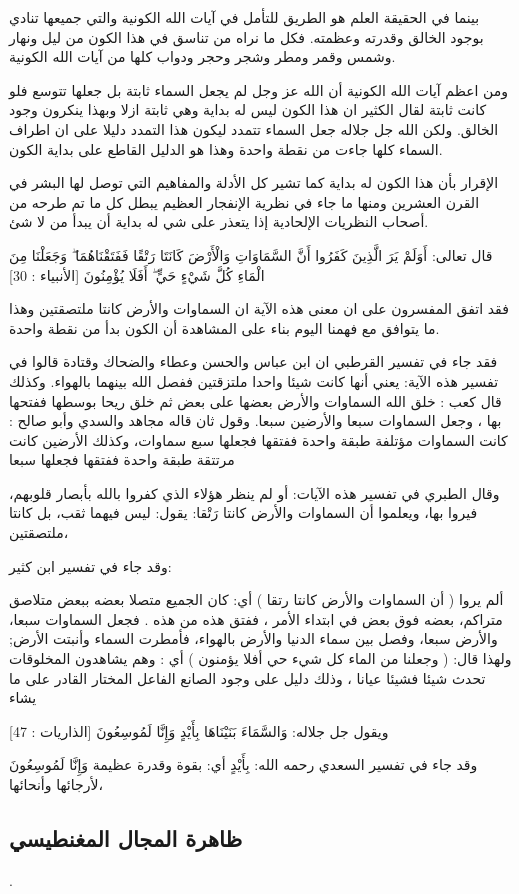 بينما في الحقيقة العلم هو الطريق للتأمل في آيات الله الكونية والتي جميعها تنادي بوجود الخالق وقدرته وعظمته. فكل ما نراه من تناسق في هذا الكون من ليل ونهار وشمس وقمر ومطر وشجر وحجر ودواب كلها من آيات الله الكونية.

ومن اعظم آيات الله الكونية أن الله عز وجل لم يجعل السماء ثابتة بل جعلها تتوسع فلو كانت ثابتة لقال الكثير ان هذا الكون ليس له بداية وهي ثابتة ازلا وبهذا ينكرون وجود الخالق. ولكن الله جل جلاله جعل السماء تتمدد ليكون هذا التمدد دليلا على ان اطراف السماء كلها جاءت من نقطة واحدة وهذا هو الدليل القاطع على بداية الكون.

الإقرار بأن هذا الكون له بداية كما تشير كل الأدلة والمفاهيم التي توصل لها البشر في القرن العشرين ومنها ما جاء في نظرية الإنفجار العظيم يبطل كل ما تم طرحه من أصحاب النظريات الإلحادية إذا يتعذر على شي له بداية أن يبدأ من لا شئ.

قال تعالى:
أَوَلَمْ يَرَ الَّذِينَ كَفَرُوا أَنَّ السَّمَاوَاتِ وَالْأَرْضَ كَانَتَا رَتْقًا فَفَتَقْنَاهُمَا ۖ وَجَعَلْنَا مِنَ الْمَاءِ كُلَّ شَيْءٍ حَيٍّ ۖ أَفَلَا يُؤْمِنُونَ [الأنبياء : 30]

فقد اتفق المفسرون على ان معنى هذه الآية ان السماوات والأرض كانتا ملتصقتين وهذا ما يتوافق مع فهمنا اليوم بناء على المشاهدة أن الكون بدأ من نقطة واحدة.

فقد جاء في تفسير القرطبي ان ابن عباس والحسن وعطاء والضحاك وقتادة قالوا في تفسير هذه الآية: يعني أنها كانت شيئا واحدا ملتزقتين ففصل الله بينهما بالهواء. وكذلك قال كعب : خلق الله السماوات والأرض بعضها على بعض ثم خلق ريحا بوسطها ففتحها بها ، وجعل السماوات سبعا والأرضين سبعا. وقول ثان قاله مجاهد والسدي وأبو صالح : كانت السماوات مؤتلفة طبقة واحدة ففتقها فجعلها سبع سماوات، وكذلك الأرضين كانت مرتتقة طبقة واحدة ففتقها فجعلها سبعا

وقال الطبري في تفسير هذه الآيات: أو لم ينظر هؤلاء الذي كفروا بالله بأبصار قلوبهم، فيروا بها، ويعلموا أن السماوات والأرض كانتا رَتْقا: يقول: ليس فيهما ثقب، بل كانتا ملتصقتين،

وقد جاء في تفسير ابن كثير:

ألم يروا ( أن السماوات والأرض كانتا رتقا ) أي: كان الجميع متصلا بعضه ببعض متلاصق متراكم، بعضه فوق بعض في ابتداء الأمر ، ففتق هذه من هذه . فجعل السماوات سبعا، والأرض سبعا، وفصل بين سماء الدنيا والأرض بالهواء، فأمطرت السماء وأنبتت الأرض; ولهذا قال: ( وجعلنا من الماء كل شيء حي أفلا يؤمنون ) أي : وهم يشاهدون المخلوقات تحدث شيئا فشيئا عيانا ، وذلك دليل على وجود الصانع الفاعل المختار القادر على ما يشاء

ويقول جل جلاله:
وَالسَّمَاءَ بَنَيْنَاهَا بِأَيْدٍ وَإِنَّا لَمُوسِعُونَ [الذاريات : 47]

وقد جاء في تفسير السعدي رحمه الله:
{ بِأَيْدٍ } أي: بقوة وقدرة عظيمة { وَإِنَّا لَمُوسِعُونَ } لأرجائها وأنحائها،


\subsection{ظاهرة المجال المغنطيسي}

\quranayah*[21][32]{\footnotesize \surahname*[21]}.


